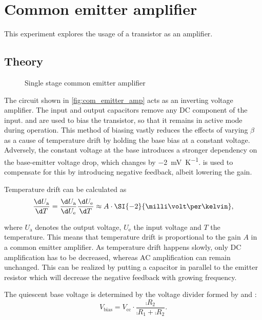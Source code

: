 \chapter{Common emitter amplifier}
This experiment explores the usage of a transistor as an amplifier.

\section{Theory}\label{sec:theory}
\begin{figure}[tbp]
	\centering
	\caption[Single Stage Common Emitter Amplifier]{Single stage common emitter amplifier}
	\label{fig:com_emitter_amp}
\end{figure}
The circuit shown in \autoref{fig:com_emitter_amp} acts as an inverting voltage amplifier.
The input and output capacitors remove any DC component of the input.
 and  are used to bias the transistor, so that it remains in active mode during operation.
This method of biasing vastly reduces the effects of varying $\beta$ as a cause of temperature drift by holding the base bias at a constant voltage.
Adversely, the constant voltage at the base introduces a stronger dependency on the base-emitter voltage drop, which changes by \SI{-2}{\milli\volt\per\kelvin}.
 is used to compensate for this by introducing negative feedback, albeit lowering the gain.

Temperature drift can be calculated as
\begin{equation}
	\frac{\d U_\text{a}}{\d T}=\frac{\d U_\text{a}}{\d U_\text{e}}\frac{\d U_\text{e}}{\d T}\approx A\cdot\SI{-2}{\milli\volt\per\kelvin},
\end{equation}

where $U_\text{a}$ denotes the output voltage, $U_\text{e}$ the input voltage and $T$ the temperature.
This means that temperature drift is proportional to the gain $A$ in a common emitter amplifier.
As temperature drift happens slowly, only DC amplification has to be decreased, whereas AC amplification can remain unchanged.
This can be realized by putting a capacitor  in parallel to the emitter resistor  which will decrease the negative feedback with growing frequency.

The quiescent base voltage is determined by the voltage divider formed by  and :
\begin{equation}\label{eq:bias_volt}
	V_\text{bias}=V_\text{cc}\cdot\frac{\comp{R_2}}{\comp{R_1}+\comp{R_2}}.
\end{equation}

